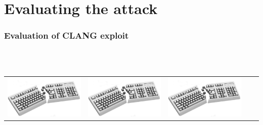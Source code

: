 \section{Evaluating the attack}

\begin{frame}
  \frametitle{Evaluation of CLANG exploit}
  \begin{description}[short]
  \item[Difficulty:]\enskip\\
  \enskip\\
  \begin{tabular}{ccccc}
    \includegraphics[scale=0.025]{input/content/figures/borken_keyboard.pdf} &
    \includegraphics[scale=0.025]{input/content/figures/borken_keyboard.pdf} &
    \includegraphics[scale=0.025]{input/content/figures/borken_keyboard.pdf} &

\end{tabular}
\end{description}
\end{frame}
